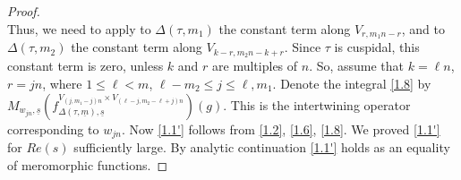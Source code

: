 \documentclass[12pts]{amsart}
\begin{document}
\begin{proof}
$$ $$
 Thus, we need to apply to $\Delta(\tau,m_1)$ the constant term along $V_{r,m_1n-r}$, and to $\Delta(\tau,m_2)$ the constant term along $V_{k-r,m_2n-k+r}$. Since $\tau$ is cuspidal, this constant term is zero, unless $k$ and $r$ are multiples of $n$. So, assume that $k=\ell n$, $r=jn$, where $1\leq \ell< m$, $\ell-m_2\leq j\leq \ell, m_1$. Denote the integral \eqref{1.8} by
  	$M_{w_{jn},\underline{s}}(f^{V_{(j,m_1-j)n}\times V_{(\ell-j,m_2-\ell+j)n}}_{\Delta(\tau,\underline{m}),\underline{s}})(g)$. This is the intertwining operator corresponding to $w_{jn}$. Now \eqref{1.1'} follows from \eqref{1.2}, \eqref{1.6}, \eqref{1.8}.  We proved \eqref{1.1'} for $Re(s)$ sufficiently large. By analytic continuation \eqref{1.1'} holds as an equality of meromorphic functions.
\end{proof}    	
    	
\end{document}
